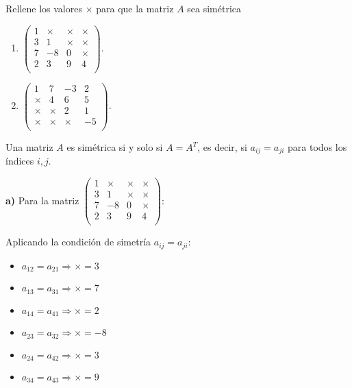 \begin{prob} 
Rellene los valores $\times$ para que la matriz $A$ sea simétrica

\begin{multicols}{2}
\begin{enumerate}[$a)$]
\item $\left( \begin{array}{cccc}
1&\times &\times &\times \\
3&1&\times &\times \\
7&-8&0&\times \\
2&3&9&4 \\
\end{array} \right).$

\item $\left( \begin{array}{cccc}
1&7 &-3 &2 \\
\times &4& 6 & 5 \\
\times &\times &2& 1 \\
\times &\times &\times &-5 \\
\end{array} \right).$
\end{enumerate}
\end{multicols}

\begin{myproof}
Una matriz $A$ es simétrica si y solo si $A = A^T$, es decir, si $a_{ij} = a_{ji}$ para todos los índices $i, j$.

\textbf{a)} Para la matriz $\left( \begin{array}{cccc}
1&\times &\times &\times \\
3&1&\times &\times \\
7&-8&0&\times \\
2&3&9&4 \\
\end{array} \right)$:

Aplicando la condición de simetría $a_{ij} = a_{ji}$:
\begin{itemize}
\item $a_{12} = a_{21} \Rightarrow \times = 3$
\item $a_{13} = a_{31} \Rightarrow \times = 7$
\item $a_{14} = a_{41} \Rightarrow \times = 2$
\item $a_{23} = a_{32} \Rightarrow \times = -8$
\item $a_{24} = a_{42} \Rightarrow \times = 3$
\item $a_{34} = a_{43} \Rightarrow \times = 9$
\end{itemize}


\end{myproof}
\end{prob}
